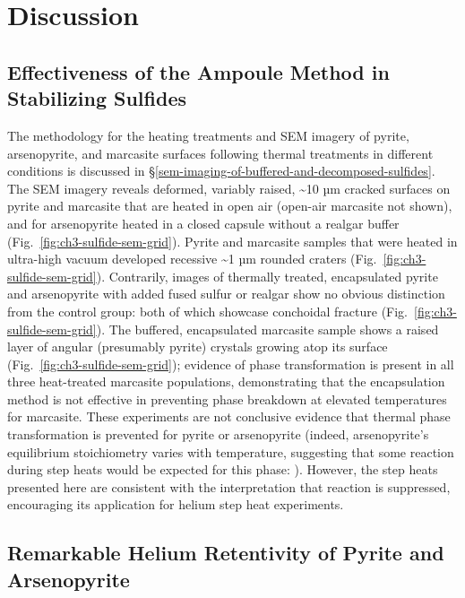 \section{Discussion}\label{sec:ch3-discussion}

\subsection{Effectiveness of the Ampoule Method in Stabilizing Sulfides}\label{ch3-sem-imaging-tube-buffered-sulfides}
The methodology for the heating treatments and SEM imagery of pyrite, arsenopyrite, and marcasite 
surfaces following thermal treatments in different conditions is discussed in \S\ref{sem-imaging-of-buffered-and-decomposed-sulfides}.
The SEM imagery reveals deformed, variably raised, \textasciitilde10 µm
cracked surfaces on pyrite and marcasite that are heated in open
air (open-air marcasite not shown), and for arsenopyrite heated in a closed capsule without a
realgar buffer (Fig.~\ref{fig:ch3-sulfide-sem-grid}). Pyrite and marcasite samples that
were heated in ultra-high vacuum developed recessive \textasciitilde1 µm
rounded craters (Fig.~\ref{fig:ch3-sulfide-sem-grid}). Contrarily, images of thermally treated, encapsulated
pyrite and arsenopyrite with added fused sulfur or realgar show no
obvious distinction from the control group: both of which showcase
conchoidal fracture (Fig.~\ref{fig:ch3-sulfide-sem-grid}). The buffered, encapsulated marcasite
sample shows a raised layer of angular (presumably pyrite)
crystals growing atop its surface (Fig.~\ref{fig:ch3-sulfide-sem-grid}); evidence of phase transformation is
present in all three heat-treated marcasite populations, demonstrating
that the encapsulation method is not effective in preventing phase
breakdown at elevated temperatures for marcasite. These
experiments are not conclusive evidence that thermal phase
transformation is prevented for pyrite or arsenopyrite (indeed, arsenopyrite's 
equilibrium stoichiometry varies with temperature, suggesting that some reaction 
during step heats would be expected for this phase: \citet{morimotoclark1961,barton1969}). 
However, the step heats presented here are consistent with the 
interpretation that reaction is suppressed, encouraging its application for helium step heat experiments.

\subsection{Remarkable Helium Retentivity of Pyrite and Arsenopyrite}\label{ch3-discussion-retentivity}

